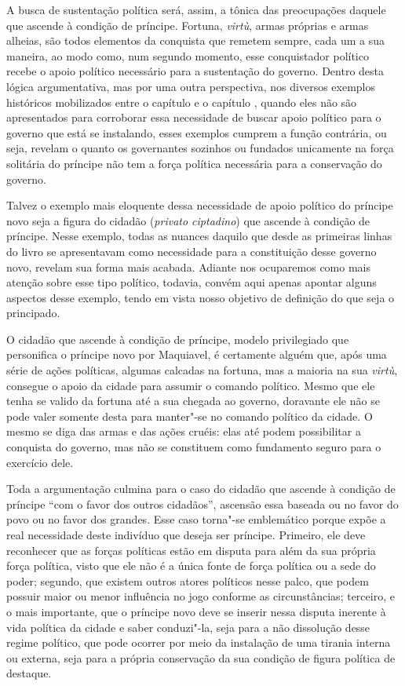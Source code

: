 A busca de sustentação política será, assim, a tônica das preocupações
daquele que ascende à condição de príncipe. Fortuna, \emph{virtù}, armas
próprias e armas alheias, são todos elementos da conquista que remetem
sempre, cada um a sua maneira, ao modo como, num segundo momento, esse
conquistador político recebe o apoio político necessário para a
sustentação do governo. Dentro desta lógica argumentativa, mas por uma
outra perspectiva, nos diversos exemplos históricos mobilizados entre o
capítulo  e o capítulo , quando eles não são apresentados para
corroborar essa necessidade de buscar apoio político para o governo que
está se instalando, esses exemplos cumprem a função contrária, ou seja,
revelam o quanto os governantes sozinhos ou fundados unicamente na força
solitária do príncipe não tem a força política necessária para a
conservação do governo.

Talvez o exemplo mais eloquente dessa necessidade de apoio político do
príncipe novo seja a figura do cidadão (\emph{privato ciptadino}) que
ascende à condição de príncipe. Nesse exemplo, todas as nuances daquilo
que desde as primeiras linhas do livro se apresentavam como necessidade
para a constituição desse governo novo, revelam sua forma mais acabada.
Adiante nos ocuparemos como mais atenção sobre esse tipo político,
todavia, convém aqui apenas apontar alguns aspectos desse exemplo, tendo
em vista nosso objetivo de definição do que seja o principado.

O cidadão que ascende à condição de príncipe, modelo privilegiado que
personifica o príncipe novo por Maquiavel, é certamente alguém que, após
uma série de ações políticas, algumas calcadas na fortuna, mas a maioria
na sua \emph{virtù}, consegue o apoio da cidade para assumir o comando
político. Mesmo que ele tenha se valido da fortuna até a sua chegada ao
governo, doravante ele não se pode valer somente desta para manter"-se no
comando político da cidade. O mesmo se diga das armas e das ações
cruéis: elas até podem possibilitar a conquista do governo, mas não se
constituem como fundamento seguro para o exercício dele.

Toda a argumentação culmina para o caso do cidadão que ascende à
condição de príncipe ``com o favor dos outros cidadãos'', ascensão essa
baseada ou no favor do povo ou no favor dos grandes. Esse caso torna"-se
emblemático porque expõe a real necessidade deste indivíduo que deseja
ser príncipe. Primeiro, ele deve reconhecer que as forças políticas
estão em disputa para além da sua própria força política, visto que ele
não é a única fonte de força política ou a sede do poder; segundo, que
existem outros atores políticos nesse palco, que podem possuir maior ou
menor influência no jogo conforme as circunstâncias; terceiro, e o mais
importante, que o príncipe novo deve se inserir nessa disputa inerente à
vida política da cidade e saber conduzi"-la, seja para a não dissolução
desse regime político, que pode ocorrer por meio da instalação de uma
tirania interna ou externa, seja para a própria conservação da sua
condição de figura política de destaque.

